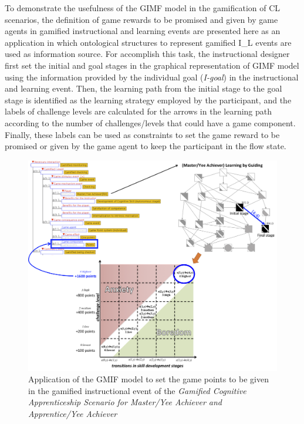 To demonstrate the usefulness of the GIMF model in the gamification of CL scenarios, the definition of game rewards to be promised and given by game agents in gamified instructional and learning events are presented here as an application in which ontological structures to represent gamified I\_L events are used as information source.
For accomplish this task, the instructional designer first set the initial and goal stages in the graphical representation of GIMF model using the information provided by the individual goal (\emph{I-goal}) in the instructional and learning event.
Then, the learning path from the initial stage to the goal stage is identified as the learning strategy employed by the participant, and the labels of challenge levels are calculated for the arrows in the learning path according to the number of challenges/levels that could have a game component.
Finally, these labels can be used as constraints to set the game reward to be promised or given by the game agent to keep the participant in the flow state.

\begin{figure}[htb]
 \caption{Application of the GMIF model to set the game points to be given in the gamified instructional event  of the \emph{Gamified Cognitive Apprenticeship Scenario for Master/Yee Achiever and Apprentice/Yee Achiever}}
 \label{fig:set-game-reward-gamified-checking}
 \centering
 \includegraphics[width=1\textwidth]{images/chap-model-gmif/set-game-reward-gamified-checking.png}
 \fautor
\end{figure}

